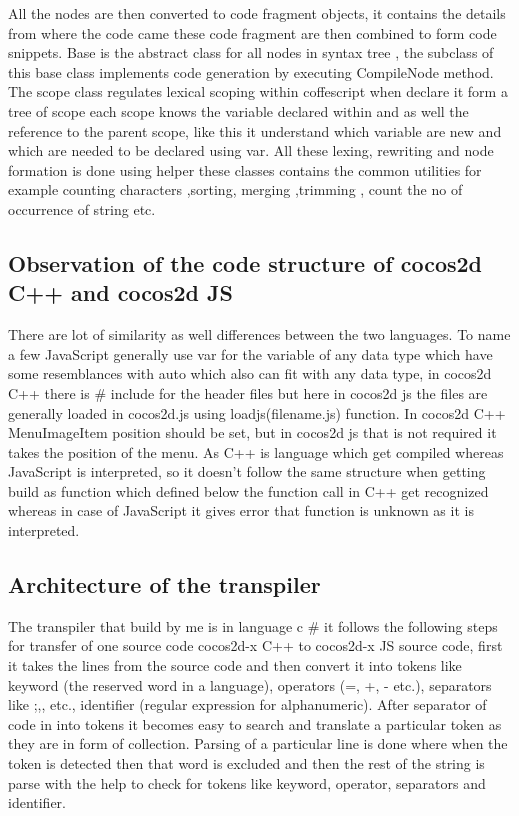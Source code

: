 \documentclass[23pt]{article}
\begin{document}
{All the nodes are then converted to code fragment objects, it contains the details from where the code came these code fragment are then combined to form code snippets. Base is the abstract class for all nodes in syntax tree , the subclass of this base class implements code generation by executing CompileNode method. The scope class regulates lexical scoping within coffescript  when declare it form a tree of scope each scope knows the variable declared within and as well the reference to the parent scope, like this it understand which variable are new and which are needed to be declared using var. All these lexing, rewriting and  node formation is done using helper these classes contains the common utilities  for example counting characters ,sorting, merging ,trimming , count the no of occurrence of string etc. \cite{coffeescript} \\
\par}

\subsection{Observation of the code structure of cocos2d C++ and cocos2d JS}

{\Large There are lot of similarity as well differences between the two languages. To name a few JavaScript generally use var for the variable of any data type which have some resemblances with auto which also can fit with any data type, in cocos2d C++ there is \# include for the header files but here in cocos2d js the files are generally loaded in cocos2d.js using loadjs(filename.js) function. In cocos2d C++ MenuImageItem position should be set, but in cocos2d js that is not required it takes the position of the menu. As C++ is language which get compiled whereas JavaScript is interpreted, so it doesn’t  follow the same structure when getting build as function which defined below the function call in C++ get recognized whereas in case of JavaScript it gives error that function is unknown as it is interpreted.  \\ \par}

\subsection{Architecture of the transpiler }

{\Large The transpiler that build by me is in language c \# it follows the following steps for transfer of one source code cocos2d-x C++ to cocos2d-x JS source code, first it takes the lines from the source code and then convert it into tokens like keyword (the reserved word in a language), operators (=, +, - etc.), separators like {;,},{ etc.}, identifier (regular expression for alphanumeric). After separator of code in into tokens it becomes easy to search and translate a particular token as they are in form of collection. Parsing of a particular line is done where when the token is detected then that word is excluded and then the rest of the string is parse with the help to check for tokens like keyword, operator, separators and identifier. \\ \par}
\end{document}
